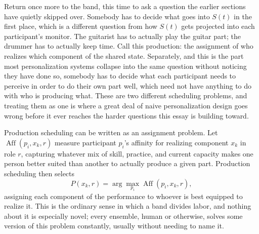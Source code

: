 \documentclass[12pt]{article}
\begin{document}
Return once more to the band, this time to ask a question the earlier sections have quietly skipped over. Somebody has to decide what goes into $S(t)$ in the first place, which is a different question from how $S(t)$ gets projected into each participant's monitor. The guitarist has to actually play the guitar part; the drummer has to actually keep time. Call this production: the assignment of who realizes which component of the shared state. Separately, and this is the part most personalization systems collapse into the same question without noticing they have done so, somebody has to decide what each participant needs to perceive in order to do their own part well, which need not have anything to do with who is producing what. These are two different scheduling problems, and treating them as one is where a great deal of naive personalization design goes wrong before it ever reaches the harder questions this essay is building toward.

Production scheduling can be written as an assignment problem. Let $\operatorname{Aff}(p_i, x_k, r)$ measure participant $p_i$'s affinity for realizing component $x_k$ in role $r$, capturing whatever mix of skill, practice, and current capacity makes one person better suited than another to actually produce a given part. Production scheduling then selects
\[
P(x_k, r) = \arg\max_{p_i} \operatorname{Aff}(p_i, x_k, r),
\]
assigning each component of the performance to whoever is best equipped to realize it. This is the ordinary sense in which a band divides labor, and nothing about it is especially novel; every ensemble, human or otherwise, solves some version of this problem constantly, usually without needing to name it.
\end{document}
